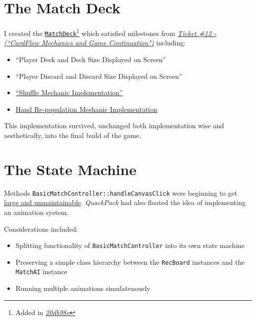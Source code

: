 \documentclass[11pt,a4paper]{report}
\begin{document}
\section{The Match Deck}

I created the \href{https://github.com/UQdeco2800/deco2800-2016-pyramidscheme/blob/master/pyramidscheme/src/main/java/uq/deco2800/pyramidscheme/match/MatchDeck.java}{\texttt{MatchDeck}}\footnote{Added in \href{https://github.com/UQdeco2800/deco2800-2016-pyramidscheme/commit/20db98e508cb49090c8ee2e58b49cf6f3ddade8c}{\textit{20db98e}}} which satisfied milestones from \href{https://github.com/UQdeco2800/deco2800-2016-pyramidscheme/issues/12}{\textit{Ticket \#12 - (``CardFlow Mechanics and Game Continuation")}} including:

\begin{itemize}
    \item ``Player Deck and Deck Size Displayed on Screen''
    \item ``Player Discard and Discard Size Displayed on Screen''
    \item \href{https://github.com/UQdeco2800/deco2800-2016-pyramidscheme/blob/6acc5545560fb6685c709032d23eb0342b823f4d/pyramidscheme/src/main/java/uq/deco2800/pyramidscheme/match/MatchDeck.java\#L126}{``Shuffle
      Mechanic Implementation''}
    \item \href{https://github.com/UQdeco2800/deco2800-2016-pyramidscheme/commit/54fbc32d67fdc76f396ea66f2122294dc84f87c9\#diff-3dc5f9a3818f63e55b566fa80a9253dbR259}{Hand Re-population Mechanic Implementation}
\end{itemize}


This implementation survived, unchanged both implementation wise and aesthetically, into the final build of the game.

\section{The State Machine}

Methods \texttt{BasicMatchController::handleCanvasClick} were beginning to get \href{https://github.com/UQdeco2800/deco2800-2016-pyramidscheme/blob/a98135fa78b9246c9abecdb7c4268ca2150176ba/pyramidscheme/src/main/java/uq/deco2800/pyramidscheme/controllers/BasicMatchController.java#L309}{large and unmaintainable}. \textit{QuackPack} had also floated the idea of implementing an animation system.

Considerations included:

\begin{itemize}
    \item Splitting functionality of \texttt{BasicMatchController} into its own state machine
    \item Preserving a simple class hierarchy between the \texttt{RecBoard} instances and the \texttt{MatchAI} instance
    \item Running multiple animations simulatenously
\end{itemize}
\end{document}
